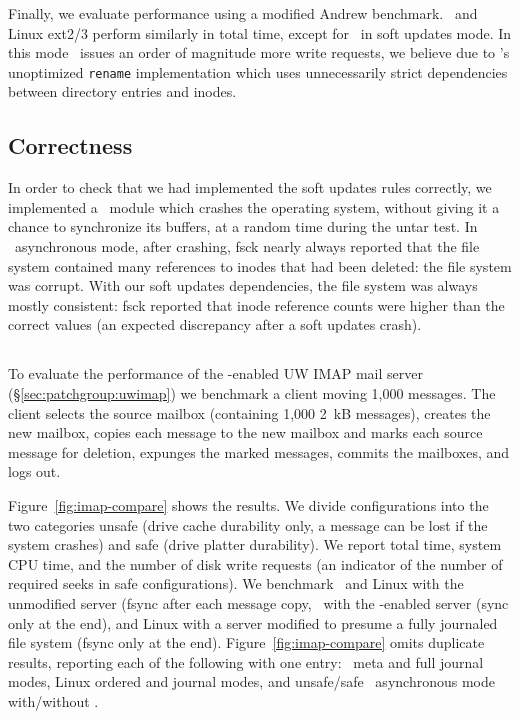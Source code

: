 Finally, we evaluate performance using a modified Andrew benchmark.
\Kudos\ and Linux ext2/3 perform similarly in total time,
%
except for \Kudos\ in soft updates mode. In this mode \Kudos\ issues
an order of magnitude more write requests, we believe due to \Kudos's
unoptimized \texttt{rename} implementation which uses unnecessarily
strict dependencies between directory entries and inodes.

\subsection {Correctness}
\label{sec:eval:correctness}

In order to check that we had implemented the soft updates rules correctly, we
implemented a \Kudos\ module which crashes the operating system, without
giving it a chance to synchronize its buffers, at a random time during the
untar test.
%
In \Kudos\ asynchronous mode, after crashing, fsck nearly always reported that
the file system contained many references to inodes that had been deleted: the
file system was corrupt.
%
With our soft updates dependencies, the file system was always mostly
consistent: fsck reported that inode reference counts were higher than the
correct values (an expected discrepancy after a soft updates crash).

\subsection {\Patchgroups}
\label{sec:evaluation:uwimap}


To evaluate the performance of the \patchgroup-enabled UW IMAP mail
server (\S\ref{sec:patchgroup:uwimap}) we benchmark a client moving
1,000 messages. The client selects the source mailbox (containing
1,000 2~kB messages), creates the new mailbox, copies each message to
the new mailbox and marks each source message for deletion, expunges
the marked messages, commits the mailboxes, and logs out.

Figure~\ref{fig:imap-compare} shows the results.
%
We divide configurations into the two categories unsafe (drive cache
durability only, a message can be lost if the system crashes) and safe
(drive platter durability).
%
We report total time, system CPU time, and the number of disk write
requests (an indicator of the number of required seeks in safe
configurations).
%
We benchmark
%
\Kudos\ and Linux with the unmodified server (fsync after each message
copy,
%
\Kudos\ with the \patchgroup-enabled server (sync only at the end),
%
and Linux with a server modified to presume a fully journaled file
system (fsync only at the end).
%
Figure~\ref{fig:imap-compare} omits duplicate results, reporting
each of the following with one entry:
%
\Kudos\ meta and full journal modes,
%
Linux ordered and journal modes,
%
and unsafe/safe \Kudos\ asynchronous mode with/without \patchgroups.

